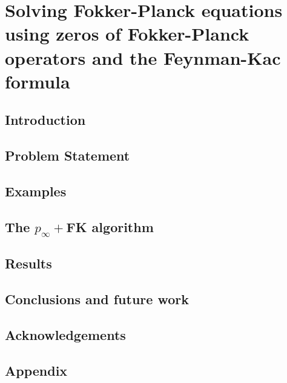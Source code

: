 \chapter{Solving Fokker-Planck equations using zeros of Fokker-Planck operators and the Feynman-Kac formula}
\section{Introduction}
\label{sec-intro--dynamic-fp}


\section{Problem Statement}
\label{sec-prob--dynamic-fp}


\section{Examples}
\label{sec-example--dynamic-fp}


\section{The \texorpdfstring{$p_\infty+$}{Lg}FK algorithm}
\label{sec-algo--dynamic-fp}



\section{Results}
\label{sec-results--dynamic-fp}



\section{Conclusions and future work}
\label{sec-conclusions--dynamic-fp}


\section*{Acknowledgements}


\section{Appendix}
\label{sec-appendix--dynamic-fp}





